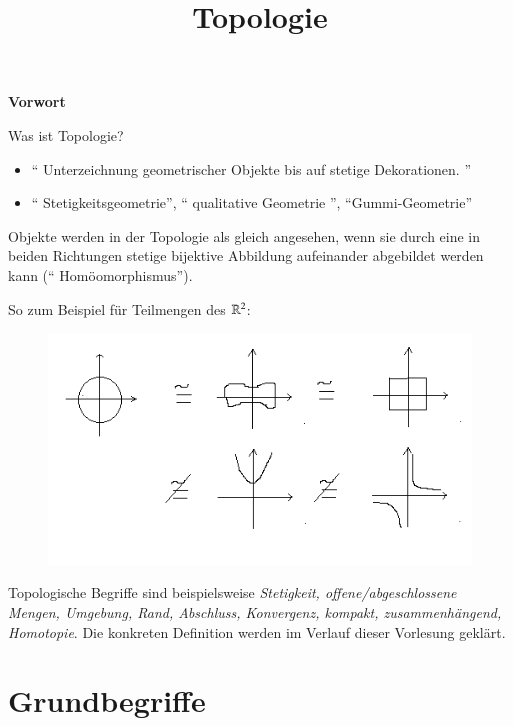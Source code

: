 \documentclass[a4paper,10pt]{scrartcl}
\title{Topologie}
\begin{document}
\maketitle

\tableofcontents
\newpage
\begin{center}
\LARGE\textbf{Vorwort}
\end{center}
\begin{seg}{Was ist Topologie?}
\begin{itemize}
\item "` Unterzeichnung geometrischer Objekte bis auf stetige Dekorationen. "'
\item "` Stetigkeitsgeometrie"', "` qualitative Geometrie "', "`Gummi-Geometrie"'
\end{itemize}
Objekte werden in der Topologie als gleich angesehen, wenn sie durch eine in beiden Richtungen stetige bijektive Abbildung aufeinander abgebildet werden kann ("` Homöomorphismus"').
\end{seg}
So zum Beispiel für Teilmengen des $\mathbb{R}^2$:
\begin{figure}[h]
\includegraphics[scale=0.7]{fig1.png}
\end{figure}
\begin{ex*} 
Topologische Begriffe sind beispielsweise \emph{Stetigkeit, offene/abgeschlossene Mengen, Umgebung, Rand, Abschluss, Konvergenz, kompakt, zusammenhängend, Homotopie}.  Die konkreten Definition werden im Verlauf dieser Vorlesung geklärt.
\end{ex*}
\section{Grundbegriffe}
\end{document}
